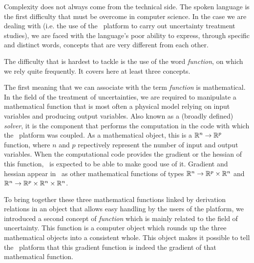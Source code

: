 
Complexity does not always come from the technical side. The spoken language is the first difficulty that must be overcome in computer science. In the case we are dealing with (i.e. the use of the \OT\ platform to carry out uncertainty treatment studies), we are faced with the language's poor ability to express, through specific and distinct words, concepts that are very different from each other.

The difficulty that is hardest to tackle is the use of the word \emph{function}, on which we rely quite frequently. It covers here at least three concepts.

The first meaning that we can associate with the term \emph{function} is mathematical. In the field of the treatment of uncertainties, we are required to manipulate a mathematical function that is most often a physical model relying on input variables and producing output variables. Also known as a (broadly defined) \emph{solver}, it is the component that performs the computation in the code with which the \OT\ platform was coupled. As a mathematical object, this is a $\mathbb{R}^{n} \to \mathbb{R}^{p}$ function, where $n$ and $p$ repectively represent the number of input and output variables. When the computational code provides the gradient or the hessian of this function, \OT\ is expected to be able to make good use of it. Gradient and hessian appear in \OT\ as other mathematical functions of types $\mathbb{R}^{n} \to \mathbb{R}^{p} \times \mathbb{R}^{n}$ and $\mathbb{R}^{n} \to \mathbb{R}^{p} \times \mathbb{R}^{n} \times \mathbb{R}^{n}$.

To bring together these three mathematical functions linked by derivation relations in an object that allows easy handling by the users of the platform, we introduced a second concept of \emph{function} which is mainly related to the field of uncertainty. This function is a computer object which rounds up the three mathematical objects into a consistent whole. This object makes it possible to tell the \OT\ platform that this gradient function is indeed the gradient of that mathematical function.

